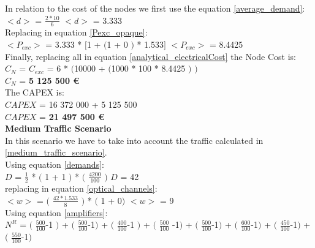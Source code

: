 In relation to the cost of the nodes we first use the equation \ref{average_demand}:\\

$<d>$ = $\frac{2 * 10}{6}$ \qquad \qquad $<d>$ = 3.333\\

Replacing in equation \ref{Pexc_opaque}:\\

$<P_{exc}>$ = 3.333 * $[$1 + $($1 + $0$ $)$ * 1.533$]$ \qquad \quad $<P_{exc}>$ = 8.4425 \\

Finally, replacing all in equation \ref{analytical_electricalCost} the Node Cost is:\\

$C_N$ = $C_{exc}$ = 6 * $($10000 + $($1000 * 100 * 8.4425 $)$ $)$\\

$C_N$ = \textbf{5 125 500 \euro}\\

The CAPEX is:\\
$CAPEX$ = 16 372 000 + 5 125 500\\

$CAPEX$ = \textbf{21 497 500 \euro}\\

\textbf{Medium Traffic Scenario}\\
In this scenario we have to take into account the traffic calculated in \ref{medium_traffic_scenario}.\\

Using equation \ref{demands}:\\

$D$ = $\frac{1}{2}$ * $($ 1 + 1 $)$ * $($ $\frac{4200}{100}$ $)$ \qquad \qquad $D$ = 42\\

replacing in equation \ref{optical_channels}:\\

$<w>$ = $($ $\frac{42 * 1.533}{8}$ $)$ * $($ 1 + 0$)$ \qquad \quad $<w>$ = 9\\

Using equation \ref{amplifiers}:\\

$N^R$ = $($ $\frac{500}{100}$-1 $)$ + $($ $\frac{500}{100}$-1$)$ + $($ $\frac{400}{100}$-1 $)$ + $($ $\frac{500}{100}$ -1$)$ + $($ $\frac{500}{100}$-1$)$ + $($ $\frac{600}{100}$-1$)$ + $($ $\frac{450}{100}$-1$)$ + $($ $\frac{550}{100}$-1$)$\\

